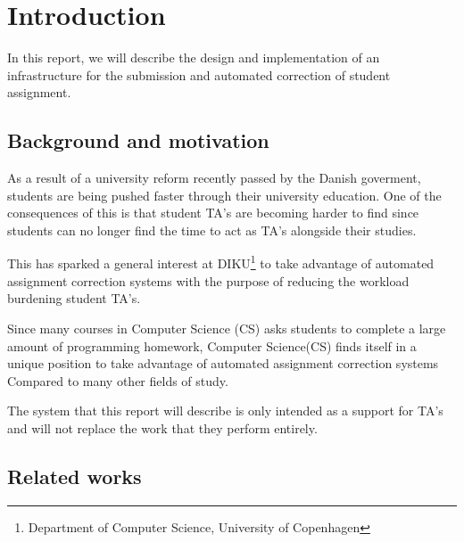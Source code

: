 \chapter{Introduction}
In this report, we will describe the design and implementation of an
infrastructure for the submission and automated correction of student
assignment.

\section{Background and motivation}
As a result of a university reform recently passed by the Danish
goverment, students are being pushed faster through their university
education. One of the consequences of this is that student TA's are
becoming harder to find since students can no longer find the time to
act as TA's alongside their studies.

This has sparked a general interest at DIKU\footnote{Department of
  Computer Science, University of Copenhagen} to take advantage of
automated assignment correction systems with the purpose of reducing
the workload burdening student TA's.

Since many courses in Computer Science (CS) asks students to complete
a large amount of programming homework, Computer Science(CS) finds
itself in a unique position to take advantage of automated assignment
correction systems Compared to many other fields of study.

The system that this report will describe is only intended as a
support for TA's and will not replace the work that they perform
entirely. 

\section{Related works}





